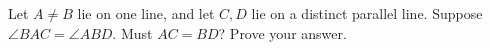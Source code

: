 Let $A\ne B$ lie on one line, and let $C,D$ lie on a distinct parallel line. Suppose $\angle BAC=\angle ABD$. Must $AC=BD$? Prove your answer.
